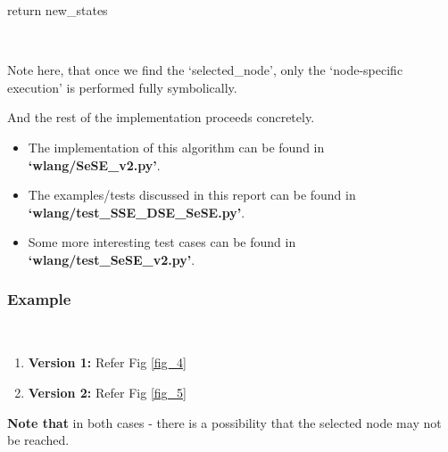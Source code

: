 \documentclass[11pt]{llncs}
\begin{document}
\begin{enumerate}
\begin{algorithm}[H]
{						      return new\_states
						}
					\end{algorithm}
					~\\

					\vspace{-3mm}

					Note here, that once we find the ‘selected\_node’, only the ‘node-specific execution’ is performed fully symbolically.

					And the rest of the implementation proceeds concretely.

					\vspace{-1mm}

					\begin{itemize}
						\item The implementation of this algorithm can be found in \textbf{‘wlang/SeSE\_v2.py’}.
						\item The examples/tests discussed in this report can be found in \textbf{‘wlang/test\_SSE\_DSE\_SeSE.py’}.
						\item Some more interesting test cases can be found in \textbf{‘wlang/test\_SeSE\_v2.py’}.
					\end{itemize}
			\end{enumerate}

		\vspace{-3mm}

		\subsubsection{Example}
			~\begin{enumerate}
				\item \textbf{Version 1:} Refer Fig \ref{fig_4}
				\item \textbf{Version 2:} Refer Fig \ref{fig_5}
			~\end{enumerate}

			\textbf{Note that} in both cases - there is a possibility that the selected node may not be reached.
\end{document}
